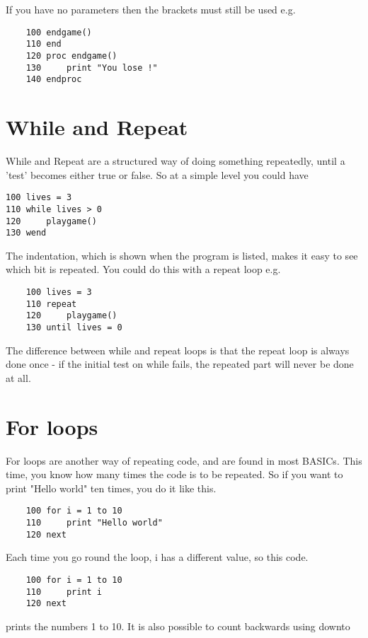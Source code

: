 If you have no parameters then the brackets must still be used e.g. 

\begin{verbatim}
	100 endgame()
	110 end
	120 proc endgame()
	130 	print "You lose !"
	140 endproc
\end{verbatim}

\section{While and Repeat}

While and Repeat are a structured way of doing something repeatedly, until a 'test' becomes either true or false. So at a simple level you could have

\begin{verbatim}
100 lives = 3
110 while lives > 0
120 	playgame()
130 wend
\end{verbatim}

The indentation, which is shown when the program is listed, makes it easy to see which bit is repeated. You could do this with a repeat loop e.g.

\begin{verbatim}
	100 lives = 3
	110 repeat
	120 	playgame()
	130 until lives = 0
\end{verbatim}

The difference between while and repeat loops is that the repeat loop is always done once - if the initial test on while fails, the repeated part will never be done at all. 

\section{For loops }

For loops are another way of repeating code, and are found in most BASICs. This time, you know how many times the code is to be repeated. So if you want to print "Hello world" ten times, you do it like this.

\begin{verbatim}
	100 for i = 1 to 10
	110 	print "Hello world"
	120	next
\end{verbatim}

Each time you go round the loop, i has a different value, so this code.

\begin{verbatim}
	100 for i = 1 to 10
	110 	print i
	120	next
\end{verbatim}

prints the numbers 1 to 10. It is also possible to count backwards using downto

